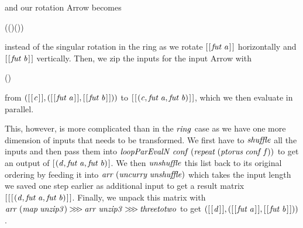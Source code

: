 \documentclass[paper=A4,twoside=true,openright,parskip=full,chapterprefix=true,headings=normal,bibliography=totoc,listof=totoc,titlepage=on,captions=tableabove,draft=false,british]{scrreprt}%
\begin{document}
and our rotation Arrow becomes


\begin{hscode}\SaveRestoreHook
{}%
%
\>[B]{}\;((\;\mathbin{>\!\!>\!\!>})\mathbin{*\!*\!*}(\;\mathbin{>\!\!>\!\!>})){}\<[E]%
\ColumnHook
\end{hscode}\resethooks
\vspace{-2\baselineskip}

instead of the singular rotation in the ring as we rotate \ensuremath{[\mskip1.5mu [\mskip1.5mu \Varid{fut}\;\Varid{a}\mskip1.5mu]\mskip1.5mu]}
horizontally and \ensuremath{[\mskip1.5mu [\mskip1.5mu \Varid{fut}\;\Varid{b}\mskip1.5mu]\mskip1.5mu]} vertically. Then, we zip the inputs for the
input Arrow with


\begin{hscode}\SaveRestoreHook
{}%
%
\>[B]{}\;(\;\;){}\<[E]%
\ColumnHook
\end{hscode}\resethooks
\vspace{-2\baselineskip}

from \ensuremath{([\mskip1.5mu [\mskip1.5mu \Varid{c}\mskip1.5mu]\mskip1.5mu],([\mskip1.5mu [\mskip1.5mu \Varid{fut}\;\Varid{a}\mskip1.5mu]\mskip1.5mu],[\mskip1.5mu [\mskip1.5mu \Varid{fut}\;\Varid{b}\mskip1.5mu]\mskip1.5mu]))} to \ensuremath{[\mskip1.5mu [\mskip1.5mu (\Varid{c},\Varid{fut}\;\Varid{a},\Varid{fut}\;\Varid{b})\mskip1.5mu]\mskip1.5mu]}, which
we then evaluate in parallel.

This, however, is more complicated than in the \ensuremath{\Varid{ring}} case as we have
one more dimension of inputs that needs to be transformed. We first have
to \ensuremath{\Varid{shuffle}} all the inputs and then pass them into
\ensuremath{\Varid{loopParEvalN}\;\Varid{conf}\;(\Varid{repeat}\;(\Varid{ptorus}\;\Varid{conf}\;\Varid{f}))} to get an output of
\ensuremath{[\mskip1.5mu (\Varid{d},\Varid{fut}\;\Varid{a},\Varid{fut}\;\Varid{b})\mskip1.5mu]}. We then \ensuremath{\Varid{unshuffle}} this list back to its
original ordering by feeding it into \ensuremath{\Varid{arr}\;(\Varid{uncurry}\;\Varid{unshuffle})} which
takes the input length we saved one step earlier as additional input to
get a result matrix \ensuremath{[\mskip1.5mu [\mskip1.5mu [\mskip1.5mu (\Varid{d},\Varid{fut}\;\Varid{a},\Varid{fut}\;\Varid{b})\mskip1.5mu]\mskip1.5mu]}. Finally, we unpack this
matrix with \ensuremath{\Varid{arr}\;(\Varid{map}\;\Varid{unzip3})\mathbin{>\!\!>\!\!>}\Varid{arr}\;\Varid{unzip3}\mathbin{>\!\!>\!\!>}\Varid{threetotwo}} to get
\ensuremath{([\mskip1.5mu [\mskip1.5mu \Varid{d}\mskip1.5mu]\mskip1.5mu],([\mskip1.5mu [\mskip1.5mu \Varid{fut}\;\Varid{a}\mskip1.5mu]\mskip1.5mu],[\mskip1.5mu [\mskip1.5mu \Varid{fut}\;\Varid{b}\mskip1.5mu]\mskip1.5mu]))}.
\end{document}
